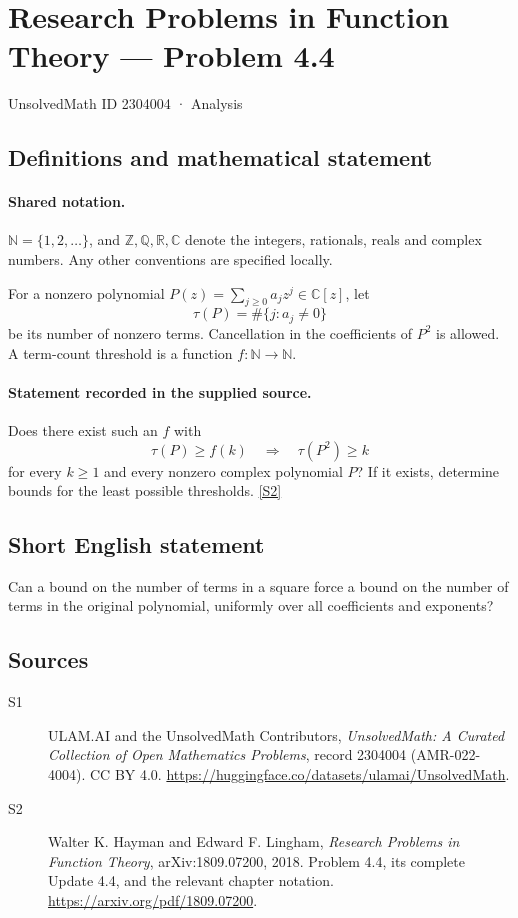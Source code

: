 \documentclass[11pt]{book}
\newcommand{\sref}[2]{\hyperlink{source:#1:#2}{[S#2]}}
\begin{document}
\setcounter{section}{2304003}
\section{Research Problems in Function Theory — Problem 4.4}\label{2304004}
{\small\sffamily UnsolvedMath ID 2304004 · Analysis}
\subsection{Definitions and mathematical statement}

\paragraph{Shared notation.}$\mathbb N=\{1,2,\ldots\}$, and $\mathbb Z,\mathbb Q,\mathbb R,\mathbb C$ denote the integers, rationals, reals and complex numbers. Any other conventions are specified locally.


For a nonzero polynomial $P(z)=\sum_{j\ge0}a_jz^j\in\mathbb C[z]$, let
\[\tau(P)=\#\{j:a_j\ne0\}\]
be its number of nonzero terms. Cancellation in the coefficients of $P^2$ is allowed. A term-count threshold is a function $f:\mathbb N\to\mathbb N$.
\paragraph{Statement recorded in the supplied source.}
Does there exist such an $f$ with
\[\tau(P)\ge f(k)\quad\Longrightarrow\quad\tau(P^2)\ge k
\]
for every $k\ge1$ and every nonzero complex polynomial $P$? If it exists, determine bounds for the least possible thresholds. \sref{2304004}{2}
\subsection{Short English statement}
Can a bound on the number of terms in a square force a bound on the number of terms in the original polynomial, uniformly over all coefficients and exponents?
\subsection{Sources}
\begin{description}
\item[\hypertarget{source:2304004:1}{S1}] ULAM.AI and the UnsolvedMath Contributors, \emph{UnsolvedMath: A Curated Collection of Open Mathematics Problems}, record 2304004 (AMR-022-4004). CC BY 4.0. \url{https://huggingface.co/datasets/ulamai/UnsolvedMath}.
\item[\hypertarget{source:2304004:2}{S2}] Walter K. Hayman and Edward F. Lingham, \emph{Research Problems in Function Theory}, arXiv:1809.07200, 2018. Problem 4.4, its complete Update 4.4, and the relevant chapter notation. \url{https://arxiv.org/pdf/1809.07200}.
\end{description}
\label{end:2304004}
\end{document}
